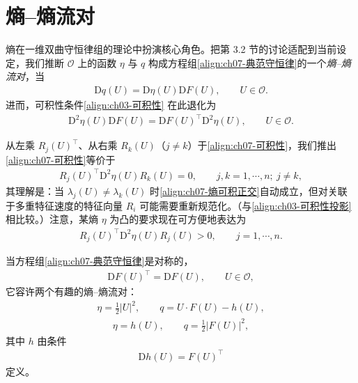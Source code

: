 \documentclass[../../main.tex]{subfiles}
\begin{document}
\section{熵--熵流对}\label{section:ch07-熵熵流对}

熵在一维双曲守恒律组的理论中扮演核心角色。把第 3.2 节的讨论适配到当前设定，我们推断 $\mathscr{O}$ 上的函数 $\eta$ 与 $q$ 构成方程组\eqref{align:ch07-典范守恒律}的一个\emph{熵--熵流对}，当
\begin{align}
\mathrm{D}q(U)=\mathrm{D}\eta(U)\mathrm{D}F(U),\qquad U\in\mathscr{O}.
\label{align:ch07-熵流对定义}
\end{align}
进而，可积性条件\eqref{align:ch03-可积性}
在此退化为
\begin{align}
\mathrm{D}^2\eta(U)\mathrm{D}F(U)=\mathrm{D}F(U)^\top\mathrm{D}^2\eta(U),\qquad U\in\mathscr{O}.
\label{align:ch07-可积性}
\end{align}

从左乘 $R_j(U)^\top$、从右乘 $R_k(U)$（$j\neq k$）于\eqref{align:ch07-可积性}，我们推出\eqref{align:ch07-可积性}等价于
\begin{align}
R_j(U)^\top\mathrm{D}^2\eta(U)R_k(U)=0,\qquad j,k=1,\cdots,n;\ j\neq k,
\label{align:ch07-熵可积正交}
\end{align}
其理解是：当 $\lambda_j(U)\neq\lambda_k(U)$ 时\eqref{align:ch07-熵可积正交}自动成立，但对关联于多重特征速度的特征向量 $R_i$ 可能需要重新规范化。（与\eqref{align:ch03-可积性投影}
相比较。）注意，某熵 $\eta$ 为凸的要求现在可方便地表达为
\begin{align}
R_j(U)^\top\mathrm{D}^2\eta(U)R_j(U)>0,\qquad j=1,\cdots,n.
\label{align:ch07-熵凸}
\end{align}

当方程组\eqref{align:ch07-典范守恒律}是对称的，
\begin{align}
\mathrm{D}F(U)^\top=\mathrm{D}F(U),\qquad U\in\mathscr{O},
\label{align:ch07-对称双曲}
\end{align}
它容许两个有趣的熵--熵流对：
\begin{align}
\eta=\tfrac12|U|^2,\qquad q=U\cdot F(U)-h(U),
\label{align:ch07-熵对1}
\end{align}
\begin{align}
\eta=h(U),\qquad q=\tfrac12|F(U)|^2,
\label{align:ch07-熵对2}
\end{align}
其中 $h$ 由条件
\begin{align}
\mathrm{D}h(U)=F(U)^\top
\label{align:ch07-h势}
\end{align}
定义。
\end{document}
